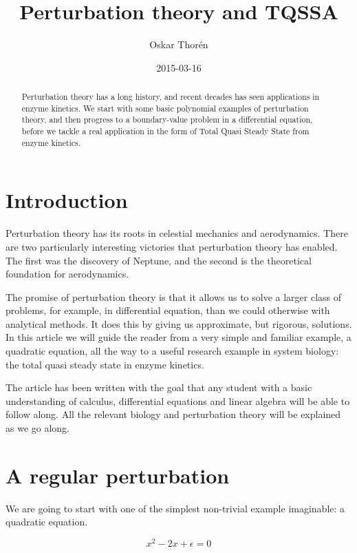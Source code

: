 \documentclass[12pt]{article}
\title{Perturbation theory and TQSSA}
\author{Oskar Thor\'{e}n}
\date{2015-03-16}
\begin{document}
\nocite{*} %
\maketitle

\begin{abstract}
Perturbation theory has a long history, and recent decades has seen applications
in enzyme kinetics. We start with some basic polynomial examples of perturbation
theory, and then progress to a boundary-value problem in a differential
equation, before we tackle a real application in the form of Total Quasi Steady
State from enzyme kinetics.
\end{abstract}

\clearpage
\tableofcontents
\clearpage

\section{Introduction}

Perturbation theory has its roots in celestial mechanics and
aerodynamics. There are two particularly interesting victories that
perturbation theory has enabled. The first was the discovery of
Neptune, and the second is the theoretical foundation for
aerodynamics.

The promise of perturbation theory is that it allows us to solve a
larger class of problems, for example, in differential equation, than
we could otherwise with analytical methods. It does this by giving us
approximate, but rigorous, solutions. In this article we will guide
the reader from a very simple and familiar example, a quadratic
equation, all the way to a useful research example in system biology:
the total quasi steady state in enzyme kinetics.

The article has been written with the goal that any student with a basic
understanding of calculus, differential equations and linear algebra will be
able to follow along. All the relevant biology and perturbation theory will be
explained as we go along.

\section{A regular perturbation}

We are going to start with one of the simplest non-trivial example imaginable:
a quadratic equation.

\begin{equation}
x^2 - 2x + \epsilon = 0
\end{equation}
\end{document}
